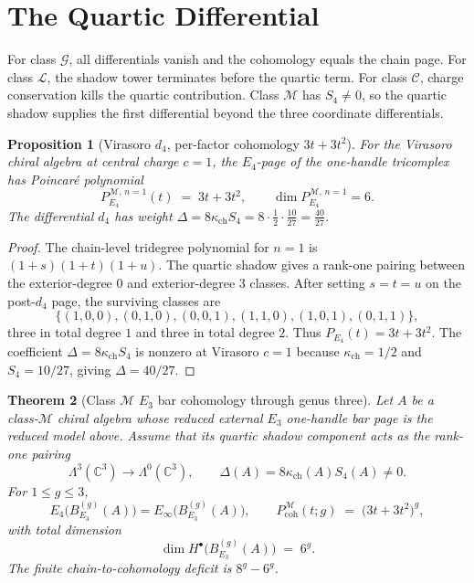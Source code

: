 \documentclass[11pt]{article}
\theoremstyle{plain}
\newtheorem{theorem}{Theorem}
\newtheorem{proposition}[theorem]{Proposition}
\theoremstyle{definition}
\theoremstyle{remark}
\newcommand{\C}{\mathbb{C}}
\newcommand{\kch}{\kappa_{\mathrm{ch}}}
\begin{document}
\section{The Quartic Differential}
\label{sec:d4-and-6g}

For class $\mathcal{G}$, all differentials vanish and the cohomology equals
the chain page. For class $\mathcal{L}$, the shadow tower terminates before
the quartic term. For class $\mathcal{C}$, charge conservation kills the
quartic contribution. Class $\mathcal{M}$ has $S_4\ne 0$, so the quartic
shadow supplies the first differential beyond the three coordinate
differentials.

\begin{proposition}[Virasoro $d_4$, per-factor cohomology $3t+3t^2$]
\label{prop:virasoro-d4-per-factor}
For the Virasoro chiral algebra at central charge $c=1$, the $E_4$-page of
the one-handle tricomplex has Poincar\'e polynomial
\[
 P_{E_4}^{\mathcal{M},\,n=1}(t) \;=\; 3t + 3t^2,
 \qquad \dim P_{E_4}^{\mathcal{M},\,n=1} = 6.
\]
The differential $d_4$ has weight
$\Delta=8\kch S_4=8\cdot\tfrac{1}{2}\cdot\tfrac{10}{27}
=\tfrac{40}{27}$.
\end{proposition}

\begin{proof}
The chain-level tridegree polynomial for $n=1$ is
$(1+s)(1+t)(1+u)$. The quartic shadow gives a rank-one pairing between
the exterior-degree $0$ and exterior-degree $3$ classes. After setting
$s=t=u$ on the post-$d_4$ page, the surviving classes are
\[
 \{(1,0,0),(0,1,0),(0,0,1),(1,1,0),(1,0,1),(0,1,1)\},
\]
three in total degree $1$ and three in total degree $2$. Thus
$P_{E_4}(t)=3t+3t^2$. The coefficient
$\Delta=8\kch S_4$ is nonzero at Virasoro $c=1$ because
$\kch=1/2$ and $S_4=10/27$, giving $\Delta=40/27$.
\end{proof}

\begin{theorem}[Class $\mathcal{M}$ $E_3$ bar cohomology through genus three]
\label{thm:class-m-e3-bar-6g}
Let $A$ be a class-$\mathcal{M}$ chiral algebra whose reduced external $E_3$
one-handle bar page is the reduced model above. Assume that its quartic
shadow component acts as the rank-one pairing
\[
 \Lambda^3(\C^3)\longrightarrow\Lambda^0(\C^3),
 \qquad \Delta(A)=8\kch(A)S_4(A)\ne 0.
\]
For $1\leq g\leq 3$,
\[
 E_4\bigl(B_{E_3}^{(g)}(A)\bigr)=
 E_\infty\bigl(B_{E_3}^{(g)}(A)\bigr),
 \qquad
 P_{\mathrm{coh}}^{\mathcal{M}}(t;g) \;=\; \bigl(3t+3t^2\bigr)^g,
\]
with total dimension
\[
 \dim H^\bullet\bigl(B_{E_3}^{(g)}(A)\bigr) \;=\; 6^g.
\]
The finite chain-to-cohomology deficit is $8^g-6^g$.
\end{theorem}
\end{document}
